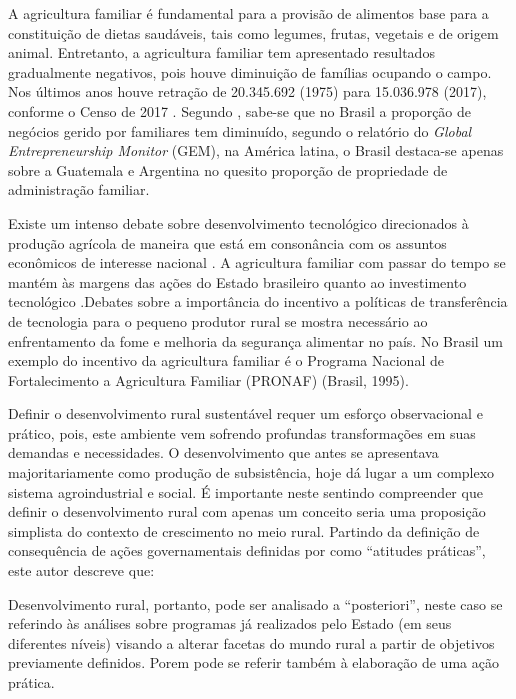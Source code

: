A agricultura familiar é fundamental para a provisão de alimentos base para a constituição de dietas saudáveis, tais como legumes, frutas, vegetais e de origem animal. Entretanto, a agricultura familiar tem apresentado resultados gradualmente negativos, pois houve diminuição de famílias ocupando o campo. Nos últimos anos houve retração de 20.345.692 (1975) para 15.036.978 (2017), conforme o Censo de 2017 \cite{ibge_censo_2018}. Segundo , sabe-se que no Brasil a proporção de negócios gerido por familiares tem diminuído, segundo o relatório do \textit{Global Entrepreneurship Monitor} (GEM), na América latina, o Brasil destaca-se apenas sobre a Guatemala e Argentina no quesito proporção de propriedade de administração familiar. 

Existe um intenso debate sobre desenvolvimento tecnológico direcionados à produção agrícola de maneira que está  em consonância com os assuntos econômicos de interesse nacional \cite{lopes_visao_2014}. A agricultura familiar com passar do tempo se mantém às margens das ações do Estado brasileiro quanto ao investimento tecnológico  \cite{beatriz_propriedade_2015}.Debates sobre a importância do incentivo a políticas de transferência de tecnologia para o pequeno produtor rural se mostra necessário ao enfrentamento da fome e melhoria da segurança alimentar no país. No Brasil um exemplo do incentivo da agricultura familiar é o Programa Nacional de Fortalecimento a Agricultura Familiar (PRONAF) (Brasil, 1995).


Definir o desenvolvimento rural sustentável requer um esforço observacional e prático, pois, este ambiente vem sofrendo profundas transformações em suas demandas e necessidades. O desenvolvimento que antes se apresentava majoritariamente como produção de subsistência, hoje dá lugar a um complexo sistema agroindustrial \cite{bastos_determinantes_2018} e social. É importante neste sentindo compreender que definir o desenvolvimento rural com apenas um conceito seria uma proposição simplista do contexto de crescimento no meio rural. Partindo da definição de consequência de ações governamentais definidas por  como “atitudes práticas”, este autor descreve que:

\begin{citacao}
[...] Desenvolvimento rural, portanto, pode ser analisado a “posteriori”, neste caso se referindo às análises sobre programas já realizados pelo Estado (em seus diferentes níveis) visando a alterar facetas do mundo rural a partir de objetivos previamente definidos. Porem pode se referir também à elaboração de uma ação prática.
\end{citacao}

